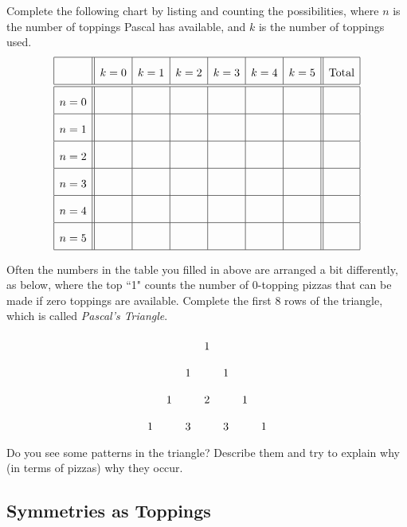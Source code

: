 \begin{ques}
Complete the following chart by listing and counting the
possibilities, where $n$ is the number of toppings Pascal has
available, and $k$ is the number of toppings used.\\
\[
{\renewcommand{\arraystretch}{2}
\begin{array}{|c||c|c|c|c|c|c||c|}
    \hline
          & k=0 & k=1 & k=2 & k=3 & k=4 & k=5 & \text{Total}\\
    \hline\hline
    n=0 &       &       &       &       &       &    &  \\
    \hline
    n=1 &       &       &       &       &       &    &  \\
    \hline
    n=2 &       &       &       &       &       &    &  \\
    \hline
    n=3 &       &       &       &       &       &    &  \\
    \hline
    n=4 &       &       &       &       &       &    &  \\
    \hline
    n=5 &       &       &       &       &       &    &  \\
    \hline
\end{array}}
\]
\end{ques}
\QM

\begin{ques} 
Often the numbers in the table you filled in above are arranged a bit
differently, as below, where the top ``1" counts the number of
0-topping pizzas that can be made if zero toppings are
available. Complete the first 8 rows of the triangle, which is called
\textit{Pascal's Triangle}.
\[
\begin{tabular}{c c c c c c c}
      &   &   & 1 &   &   &  \\
      &   & 1 &   & 1 &   &  \\
      & 1 &   & 2 &   & 1 &  \\
    1 &   & 3 &   & 3 &   & 1
\end{tabular}
\vspace{2in}
\]
Do you see some patterns in the triangle?  Describe them and try to
explain why (in terms of pizzas) why they occur.
\end{ques}
\QM



\subsection{Symmetries as Toppings}

